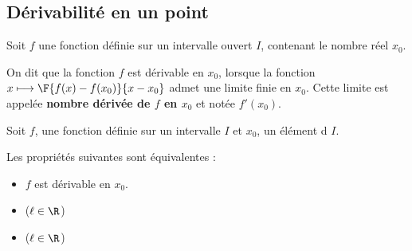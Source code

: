 \subsection{Dérivabilité en un point}
\begin{definition}
Soit $f$ une fonction définie sur un intervalle ouvert $I$, contenant le nombre réel $x_0$.
\par On dit que la fonction $f$ est dérivable en $x_0$, lorsque la fonction $x\longmapsto \F{f(x)-f(x_0)}{x-x_0}$ admet une limite finie en $x_0$. Cette limite est appelée \textbf{nombre dérivée de $f$ en $x_0$} et notée $f'(x_0)$.
\end{definition}
\hspace*{-0.8cm}
\begin{propriete}
Soit $f$, une fonction définie sur un intervalle $I$ et $x_0$, un élément d $I$.
\par Les propriétés suivantes sont équivalentes : 
\begin{itemize}
	\item $f$ est dérivable en $x_0$.
	\item {} ($\ell\in \R$)
	\item {} ($\ell\in\R$)
\end{itemize}
\end{propriete}
